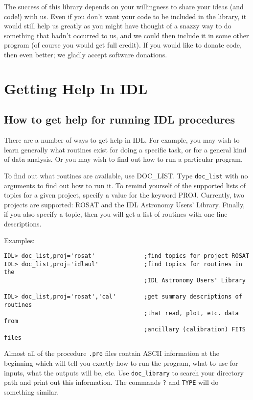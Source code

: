 The success of this library depends on your willingness to share your ideas
(and code!) with us. Even if you don't want your code to be included in the
library, it would still help us greatly as you might have thought of a snazzy
way to do something that hadn't occurred to us, and we could then include it in
some other program (of course you would get full credit). If you would like to
donate code, then even better; we gladly accept software donations.
 
\chapter{Getting Help In IDL }
 

\section{How to get help for running IDL procedures}
 
There are a number of ways to get help in IDL. For example, you may wish to
learn generally what routines exist for doing a specific task, or for a general
kind of data analysis. Or you may wish to find out how to run a particular
program.
 
To find out what routines are available, use DOC{\_}LIST. Type {\tt doc{\_}list} with no
arguments to find out how to run it. To remind yourself of the supported lists
of topics for a given project, specify a value for the keyword PROJ. Currently,
two projects are supported: ROSAT and the IDL Astronomy Users' Library.
Finally, if you also specify a topic, then you will get a list of routines with
one line descriptions.
 
Examples:

\medskip\noindent
\begin{verbatim}
IDL> doc_list,proj='rosat'              ;find topics for project ROSAT
IDL> doc_list,proj='idlaul'             ;find topics for routines in the
                                        ;IDL Astronomy Users' Library
 
IDL> doc_list,proj='rosat','cal'        ;get summary descriptions of routines
                                        ;that read, plot, etc. data from
                                        ;ancillary (calibration) FITS files
\end{verbatim}
Almost all of the procedure {\tt .pro} files contain ASCII information at the
beginning which will tell you exactly how to run the program, what to use for
inputs, what the outputs will be, etc. Use {\tt doc{\_}library} to search your
directory path and print out this information. The commands {\tt ?} and {\tt TYPE}
will do something similar.
 
